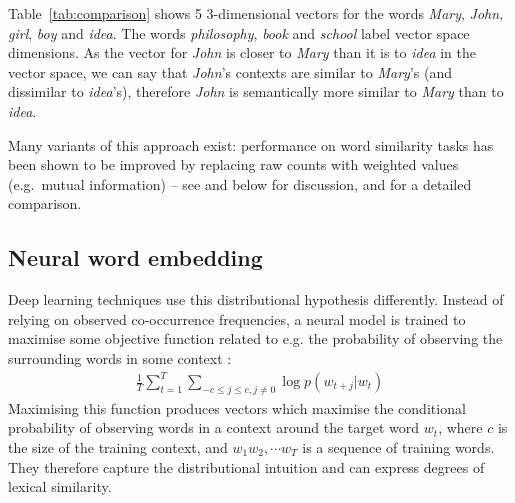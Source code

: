 Table~\ref{tab:comparison} shows 5 3-dimensional vectors for the words
\textit{Mary}, \textit{John}, \textit{girl}, \textit{boy} and \textit{idea}. The
words \textit{philosophy}, \textit{book} and \textit{school} label vector space
dimensions.
%
As the vector for \textit{John} is closer to \textit{Mary} than it is
to \textit{idea} in the vector space, we can say that \textit{John}'s
contexts are similar to \textit{Mary}'s (and dissimilar to
\textit{idea}'s), therefore \textit{John} is semantically more similar
to \textit{Mary} than to \textit{idea}.

Many variants of this approach exist: performance on word similarity
tasks has been shown to be improved by replacing raw counts with
weighted values (e.g.~mutual information) -- see
\cite{turney2010frequency} and below for discussion, and
\cite{kiela-clark:2014:CVSC} for a detailed comparison.

\subsection{Neural word embedding}
\label{sec:neural-embedding}

Deep learning techniques use this distributional hypothesis
differently. Instead of relying on observed co-occurrence frequencies,
a neural model is trained to maximise some objective function related
to e.g. the probability of observing the surrounding words in some
context \cite{mikolov2013distributed}:
%
\begin{align}
 \frac{1}{T}\sum^{T}_{t=1}\sum_{-c \leq j \leq c, j\neq0} \log p(w_{t+j}|w_t)
  \label{eq:objective-func}
\end{align}
%
\noindent
Maximising this function produces vectors which maximise the
conditional probability of observing words in a context around the
target word $w_t$, where $c$ is the size of the training context, and
$w_1 w_2, \cdots w_T$ is a sequence of training words. They therefore
capture the distributional intuition and can express degrees of
lexical similarity.


